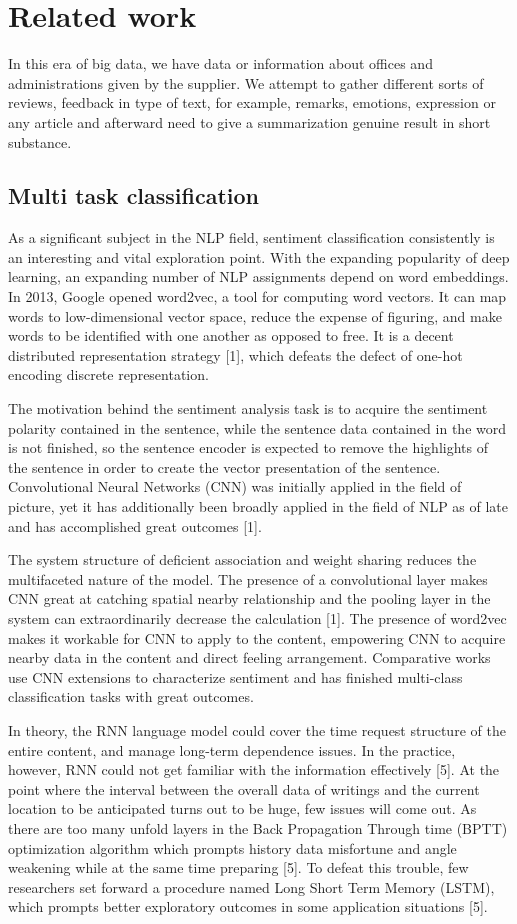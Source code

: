 \documentclass[sigplan,screen]{acmart}
\begin{document}
\section{Related work }
In this era of big data, we have data or information about offices and administrations given by the supplier. We attempt to gather different sorts of reviews, feedback in type of text, for example, remarks, emotions, expression or any article and afterward need to give a summarization genuine result in short substance.


\subsection{Multi task classification}
As a significant subject in the NLP field, sentiment classification consistently is an interesting and vital exploration point. With the expanding popularity of deep learning, an expanding number of NLP assignments depend on word embeddings. In 2013, Google opened word2vec, a tool for computing word vectors. It can map words to low-dimensional vector space, reduce the expense of figuring, and make words to be identified with one another as opposed to free. It is a decent distributed representation strategy [1], which defeats the defect of one-hot encoding discrete representation.


The motivation behind the sentiment analysis task is to acquire the sentiment polarity contained in the sentence, while the sentence data contained in the word is not finished, so the sentence encoder is expected to remove the highlights of the sentence in order to create the vector presentation of the sentence. Convolutional Neural Networks (CNN) was initially applied in the field of picture, yet it has additionally been broadly applied in the field of NLP as of late and has accomplished great outcomes [1].

The system structure of deficient association and weight sharing reduces the multifaceted nature of the model. The presence of a convolutional layer makes CNN great at catching spatial nearby relationship and the pooling layer in the system can extraordinarily decrease the calculation [1]. The presence of word2vec makes it workable for CNN to apply to the content, empowering CNN to acquire nearby data in the content and direct feeling arrangement. Comparative works use CNN extensions to characterize sentiment and has finished multi-class classification tasks with great outcomes. 


In theory, the RNN language model could cover the time request structure of the entire content, and manage long-term dependence issues. In the practice, however, RNN could not get familiar with the information effectively [5]. At the point where the interval between the overall data of writings and the current location to be anticipated turns out to be huge, few issues will come out. As there are too many unfold layers in the Back Propagation Through time (BPTT) optimization algorithm which prompts history data misfortune and angle weakening while at the same time preparing [5]. To defeat this trouble, few researchers set forward a procedure named Long Short Term Memory (LSTM), which prompts better exploratory outcomes in some application situations [5].
\end{document}
